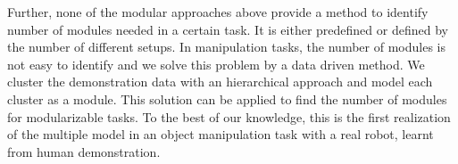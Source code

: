 Further, none of the modular approaches above provide a method to identify number of modules needed in a certain task. It is either predefined or defined by the number of different setups. In manipulation tasks, the number of modules is not easy to identify and we solve this problem by a data driven method. We cluster the demonstration data with an hierarchical approach and model each cluster as a module. This solution can be applied to find the number of modules for modularizable tasks. To the best of our knowledge, this is the first realization of the multiple model in an object manipulation task with a real robot, learnt from human demonstration.




%
%
%






%


